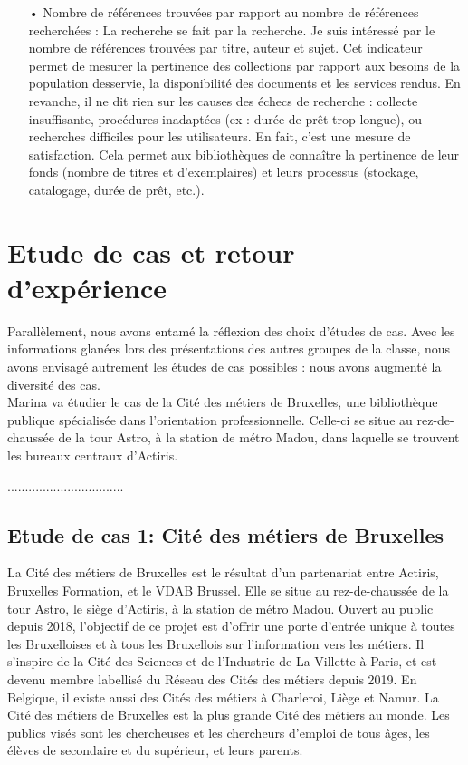 \documentclass[french,a4paper,12pt]{article}
\begin{document}
\begin{enumerate}
\item[•]  Nombre de références trouvées par rapport au nombre de références recherchées : La recherche se fait par la recherche. Je suis intéressé par le nombre de références trouvées par titre, auteur et sujet. Cet indicateur permet de mesurer la pertinence des collections par rapport aux besoins de la population desservie, la disponibilité des documents et les services rendus. En revanche, il ne dit rien sur les causes des échecs de recherche : collecte insuffisante, procédures inadaptées (ex : durée de prêt trop longue), ou recherches difficiles pour les utilisateurs. En fait, c'est une mesure de satisfaction. Cela permet aux bibliothèques de connaître la pertinence de leur fonds (nombre de titres et d'exemplaires) et leurs processus (stockage, catalogage, durée de prêt, etc.). 

\end{enumerate}

\newpage
\section{Etude de cas et retour d'expérience}
\quad Parallèlement, nous avons entamé la réflexion des choix d’études de cas. Avec les informations glanées lors des présentations des autres groupes de la classe, nous avons envisagé autrement les études de cas possibles : nous avons augmenté la diversité des cas.\\ 

Marina va étudier le cas de la Cité des métiers de Bruxelles, une bibliothèque publique spécialisée dans l’orientation professionnelle. Celle-ci se situe au rez-de-chaussée de la tour Astro, à la station de métro Madou, dans laquelle se trouvent les bureaux centraux d’Actiris.

.................................\\
\subsection{Etude de cas 1: Cité des métiers de Bruxelles }

\quad La Cité des métiers de Bruxelles est le résultat d’un partenariat entre Actiris, Bruxelles Formation, et le VDAB Brussel. Elle se situe au rez-de-chaussée de la tour Astro, le siège d’Actiris, à la station de métro Madou.
Ouvert au public depuis 2018, l’objectif de ce projet est d’offrir une porte d’entrée unique à toutes les Bruxelloises et à tous les Bruxellois sur l’information vers les métiers. Il s’inspire de la Cité des Sciences et de l’Industrie de La Villette à Paris, et est devenu membre labellisé du Réseau des Cités des métiers depuis 2019. En Belgique, il existe aussi des Cités des métiers à Charleroi, Liège et Namur. La Cité des métiers de Bruxelles est la plus grande Cité des métiers au monde.
Les publics visés sont les chercheuses et les chercheurs d’emploi de tous âges, les élèves de secondaire et du supérieur, et leurs parents.
\end{document}
